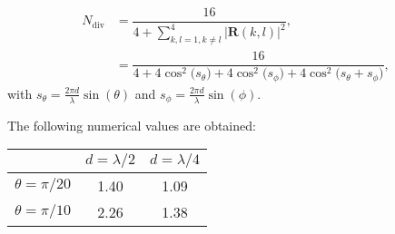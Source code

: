 \documentclass [a4paper, 11pt] {article}
\begin{document}
\begin{solution}
\begin{enumerate}
\begin{itemize}
    \begin{align}
        N_{\text{div}} &= \dfrac{16}{4+ \sum_{k,l=1,k \neq l}^{4} |\mathbf{R}(k,l)|^2}, \\
        &= \dfrac{16}{4+ 4\cos^2\Big(s_\theta\Big) + 4\cos^2\Big(s_\phi\Big) + 4\cos^2\Big(s_\theta + s_\phi\Big)},
    \end{align}
    with $s_\theta = \frac{2\pi d}{\lambda}\sin(\theta)$ and $s_\phi = \frac{2\pi d}{\lambda}\sin(\phi)$.
    
    The following numerical values are obtained:
    
    \begin{center}
    \begin{tabular}{ |c|c|c| } 
     \hline
     & $d = \lambda/2$ & $d = \lambda/4$ \\ 
     \hline
    $\theta = \pi/20$ & 1.40 & 1.09 \\ 
    $\theta = \pi/10$ & 2.26 & 1.38 \\ 
    \hline
    \end{tabular}
    \end{center}

    \end{itemize}

\end{enumerate}
    \end{solution}
    
\end{document}
